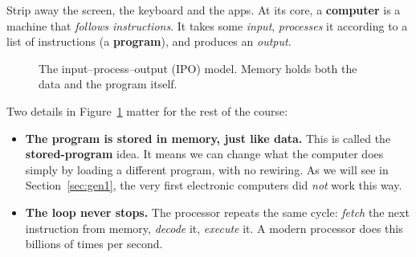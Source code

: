 \documentclass[11pt,a4paper]{article}
\newcommand{\term}[1]{\textbf{\color{mintdeep}#1}}
\begin{document}
Strip away the screen, the keyboard and the apps. At its core, a \term{computer} is a machine that \emph{follows instructions}. It takes some \emph{input}, \emph{processes} it according to a list of instructions (a \term{program}), and produces an \emph{output}.

\begin{figure}[H]
\centering
{}
\caption{The input--process--output (IPO) model. Memory holds both the data and the program itself.}
\label{fig:ipo}
\end{figure}

Two details in Figure~\ref{fig:ipo} matter for the rest of the course:

\begin{itemize}
  \item \textbf{The program is stored in memory, just like data.} This is called the \term{stored-program} idea. It means we can change what the computer does simply by loading a different program, with no rewiring. As we will see in Section~\ref{sec:gen1}, the very first electronic computers did \emph{not} work this way.
  \item \textbf{The loop never stops.} The processor repeats the same cycle: \emph{fetch} the next instruction from memory, \emph{decode} it, \emph{execute} it. A modern processor does this billions of times per second.
\end{itemize}
\end{document}
